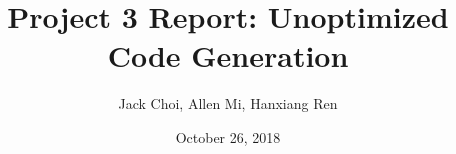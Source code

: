 \title{Project 3 Report: Unoptimized Code Generation}
\author{Jack Choi, Allen Mi, Hanxiang Ren}
\date{October 26, 2018}
\newcommand{\reportfile}{scalars_report_3.tex}